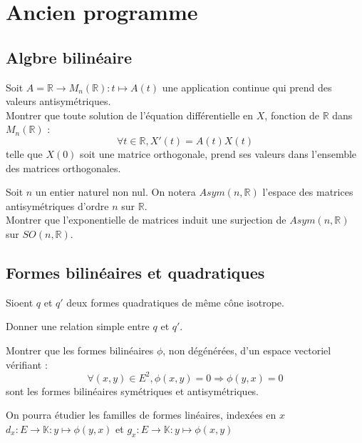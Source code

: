 \section{Ancien programme}

\subsection{Algbre bilin\'eaire}

\begin{exer}
Soit $A = \mathbb{R} \rightarrow M_n(\mathbb{R}) : t \mapsto A(t)$ une application continue qui prend des valeurs antisymétriques.\\
Montrer que toute solution de l'équation différentielle en $X$, fonction de $\mathbb{R}$ dans $M_n(\mathbb{R})$ :
\[\forall t \in \mathbb{R} , X'(t) = A(t)X(t)\]
telle que $X(0)$ soit une matrice orthogonale, prend ses valeurs dans l'ensemble des matrices orthogonales.
\end{exer}

\begin{exer}
Soit $n$ un entier naturel non nul. On notera $Asym(n,\mathbb{R})$ l'espace des matrices antisymétriques d'ordre $n$ %
sur $\mathbb{R}$.\\
Montrer que l'exponentielle de matrices induit une surjection de $Asym(n,\mathbb{R})$ sur $SO(n,\mathbb{R})$.
\end{exer}

\subsection{Formes bilin\'eaires et quadratiques}

\begin{exer}
Sioent $q$ et $q'$ deux formes quadratiques de même cône isotrope.

Donner une relation simple entre $q$ et $q'$.
\end{exer}

\begin{exer}
Montrer que les formes bilinéaires $\phi$, non dégénérées, d'un espace vectoriel vérifiant :
\[\forall (x,y) \in E^2, \phi (x,y) = 0 \Rightarrow \phi (y,x) = 0\]
sont les formes bilinéaires symétriques et antisymétriques.

\medskip
On pourra \'etudier les familles de formes lin\'eaires, indexées en $x$ 
$d_x : E \rightarrow \mathbb{K} : y \mapsto \phi(y,x)$ et $g_x : E \rightarrow \mathbb{K} : y \mapsto \phi(x,y)$
\end{exer}

